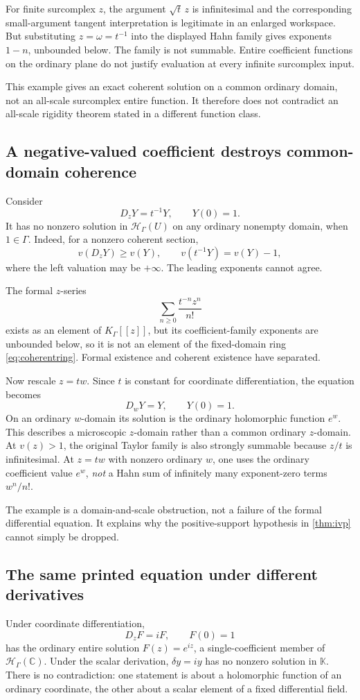 \documentclass[11pt,letterpaper]{article}
\numberwithin{equation}{section}
\theoremstyle{definition}
\theoremstyle{remark}
\newcommand{\K}{\mathbb K}
\newcommand{\C}{\mathbb C}
\newcommand{\HH}{\mathcal H}
\begin{document}
For finite surcomplex $z$, the argument $\sqrt t\,z$ is infinitesimal and the corresponding small-argument tangent interpretation is legitimate in an enlarged workspace. But substituting $z=\omega=t^{-1}$ into the displayed Hahn family gives exponents $1-n$, unbounded below. The family is not summable. Entire coefficient functions on the ordinary plane do not justify evaluation at every infinite surcomplex input.

This example gives an exact coherent solution on a common ordinary domain, not an all-scale surcomplex entire function. It therefore does not contradict an all-scale rigidity theorem stated in a different function class.

\subsection{A negative-valued coefficient destroys common-domain coherence}
Consider
\begin{equation}\label{eq:singular}
 D_zY=t^{-1}Y,\qquad Y(0)=1.
\end{equation}
It has no nonzero solution in $\HH_\Gamma(U)$ on any ordinary nonempty domain, when $1\in\Gamma$. Indeed, for a nonzero coherent section,
\[
 v(D_zY)\ge v(Y),\qquad v(t^{-1}Y)=v(Y)-1,
\]
where the left valuation may be $+\infty$. The leading exponents cannot agree.

The formal $z$-series
\[
 \sum_{n\ge0}\frac{t^{-n}z^n}{n!}
\]
exists as an element of $K_\Gamma[[z]]$, but its coefficient-family exponents are unbounded below, so it is not an element of the fixed-domain ring \eqref{eq:coherentring}. Formal existence and coherent existence have separated.

Now rescale $z=tw$. Since $t$ is constant for coordinate differentiation, the equation becomes
\[
 D_wY=Y,\qquad Y(0)=1.
\]
On an ordinary $w$-domain its solution is the ordinary holomorphic function $e^w$. This describes a microscopic $z$-domain rather than a common ordinary $z$-domain. At $v(z)>1$, the original Taylor family is also strongly summable because $z/t$ is infinitesimal. At $z=tw$ with nonzero ordinary $w$, one uses the ordinary coefficient value $e^w$, \emph{not} a Hahn sum of infinitely many exponent-zero terms $w^n/n!$.

The example is a domain-and-scale obstruction, not a failure of the formal differential equation. It explains why the positive-support hypothesis in \cref{thm:ivp} cannot simply be dropped.

\subsection{The same printed equation under different derivatives}
Under coordinate differentiation,
\[
 D_zF=iF,\qquad F(0)=1
\]
has the ordinary entire solution $F(z)=e^{iz}$, a single-coefficient member of $\HH_\Gamma(\C)$. Under the scalar derivation, $\delta y=iy$ has no nonzero solution in $\K$. There is no contradiction: one statement is about a holomorphic function of an ordinary coordinate, the other about a scalar element of a fixed differential field.
\end{document}
